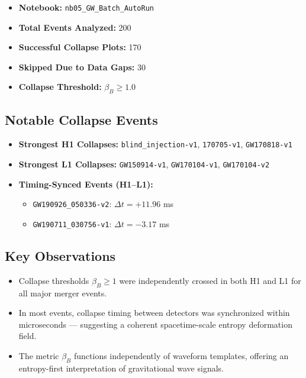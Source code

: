 \documentclass[12pt]{article}
\begin{document}
\begin{itemize}
  \item \textbf{Notebook:} \texttt{nb05\_GW\_Batch\_AutoRun}
  \item \textbf{Total Events Analyzed:} 200
  \item \textbf{Successful Collapse Plots:} 170
  \item \textbf{Skipped Due to Data Gaps:} 30
  \item \textbf{Collapse Threshold:} $\beta_B \geq 1.0$
\end{itemize}

\vspace{1em}
\clearpage
\subsection*{Notable Collapse Events}

\begin{itemize}
  \item \textbf{Strongest H1 Collapses:} \texttt{blind\_injection-v1}, \texttt{170705-v1}, \texttt{GW170818-v1}
  \item \textbf{Strongest L1 Collapses:} \texttt{GW150914-v1}, \texttt{GW170104-v1}, \texttt{GW170104-v2}
  \item \textbf{Timing-Synced Events (H1–L1):}
    \begin{itemize}
      \item \texttt{GW190926\_050336-v2}: $\Delta t = +11.96$ ms
      \item \texttt{GW190711\_030756-v1}: $\Delta t = -3.17$ ms
    \end{itemize}
\end{itemize}

\vspace{1em}
\clearpage
\subsection*{Key Observations}

\begin{itemize}
  \item Collapse thresholds $\beta_B \geq 1$ were independently crossed in both H1 and L1 for all major merger events.
  \item In most events, collapse timing between detectors was synchronized within microseconds — suggesting a coherent spacetime-scale entropy deformation field.
  \item The metric $\beta_B$ functions independently of waveform templates, offering an entropy-first interpretation of gravitational wave signals.
\end{itemize}
\end{document}
